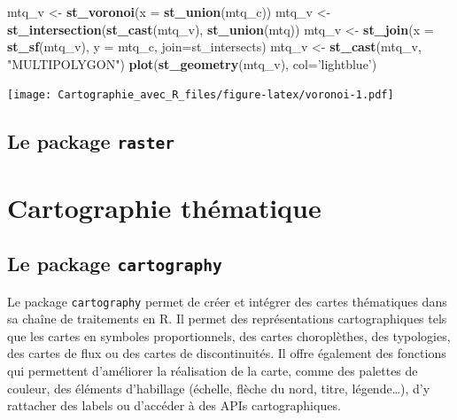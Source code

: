 \documentclass[]{book}
\newenvironment{Shaded}{\begin{snugshade}}{\end{snugshade}}
\newcommand{\KeywordTok}[1]{\textcolor[rgb]{0.13,0.29,0.53}{\textbf{#1}}}
\newcommand{\DataTypeTok}[1]{\textcolor[rgb]{0.13,0.29,0.53}{#1}}
\newcommand{\StringTok}[1]{\textcolor[rgb]{0.31,0.60,0.02}{#1}}
\newcommand{\NormalTok}[1]{#1}
\begin{document}
\begin{Shaded}
\begin{Highlighting}[]
\NormalTok{mtq_v <-}\StringTok{ }\KeywordTok{st_voronoi}\NormalTok{(}\DataTypeTok{x =} \KeywordTok{st_union}\NormalTok{(mtq_c))}
\NormalTok{mtq_v <-}\StringTok{ }\KeywordTok{st_intersection}\NormalTok{(}\KeywordTok{st_cast}\NormalTok{(mtq_v), }\KeywordTok{st_union}\NormalTok{(mtq))}
\NormalTok{mtq_v <-}\StringTok{ }\KeywordTok{st_join}\NormalTok{(}\DataTypeTok{x =} \KeywordTok{st_sf}\NormalTok{(mtq_v), }\DataTypeTok{y =}\NormalTok{ mtq_c, }\DataTypeTok{join=}\NormalTok{st_intersects)}
\NormalTok{mtq_v <-}\StringTok{ }\KeywordTok{st_cast}\NormalTok{(mtq_v, }\StringTok{"MULTIPOLYGON"}\NormalTok{)}
\KeywordTok{plot}\NormalTok{(}\KeywordTok{st_geometry}\NormalTok{(mtq_v), }\DataTypeTok{col=}\StringTok{'lightblue'}\NormalTok{)}
\end{Highlighting}
\end{Shaded}

\texttt{[image: Cartographie\_avec\_R\_files/figure-latex/voronoi-1.pdf]}

\section{\texorpdfstring{Le package
\texttt{raster}}{Le package raster}}\label{le-package-raster}

\hypertarget{jour2}{\chapter{Cartographie thématique}\label{jour2}}

\section{\texorpdfstring{Le package
\texttt{cartography}}{Le package cartography}}\label{le-package-cartography}

Le package \texttt{cartography} permet de créer et intégrer des cartes
thématiques dans sa chaîne de traitements en R. Il permet des
représentations cartographiques tels que les cartes en symboles
proportionnels, des cartes choroplèthes, des typologies, des cartes de
flux ou des cartes de discontinuités. Il offre également des fonctions
qui permettent d'améliorer la réalisation de la carte, comme des
palettes de couleur, des éléments d'habillage (échelle, flèche du nord,
titre, légende\ldots{}), d'y rattacher des labels ou d'accéder à des
APIs cartographiques.
\end{document}
